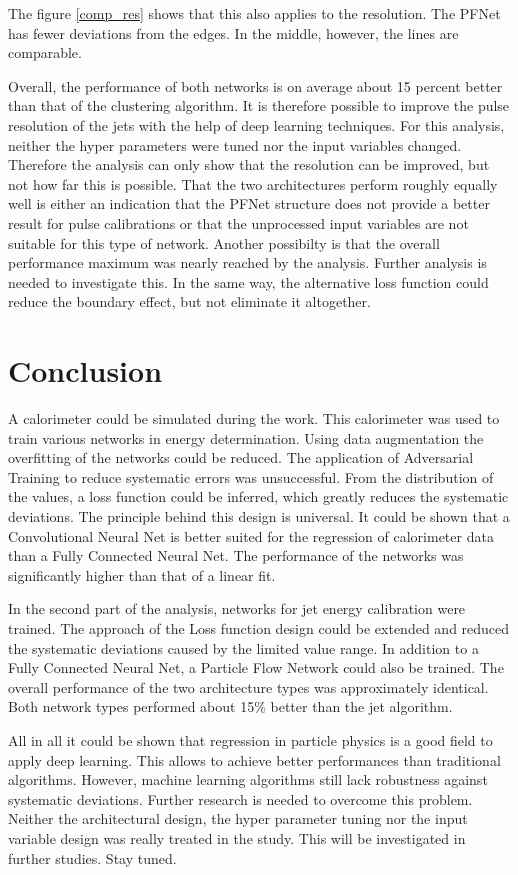 \documentclass[12pt, a4paper]{thesis}
\begin{document}
The figure \ref{comp_res} shows that this also applies to the
resolution. The PFNet has fewer deviations from the edges. In the
middle, however, the lines are comparable.

Overall, the performance of both networks is on average about 15
percent better than that of the clustering algorithm.  It is therefore
possible to improve the pulse resolution of the jets with the help of
deep learning techniques.  For this analysis, neither the hyper
parameters were tuned nor the input variables changed. Therefore the
analysis can only show that the resolution can be improved, but not
how far this is possible. That the two architectures perform roughly
equally well is either an indication that the PFNet structure does not
provide a better result for pulse calibrations or that the unprocessed
input variables are not suitable for this type of network. Another
possibilty is that the overall performance maximum was nearly reached
by the analysis. Further analysis is needed to investigate this.  In
the same way, the alternative loss function could reduce the boundary
effect, but not eliminate it altogether.

\chapter{Conclusion}
\label{sec:org62a45ca}

A calorimeter could be simulated during the work. This calorimeter was
used to train various networks in energy determination. Using data
augmentation the overfitting of the networks could be reduced. The
application of Adversarial Training to reduce systematic errors was
unsuccessful.  From the distribution of the values, a loss function
could be inferred, which greatly reduces the systematic
deviations. The principle behind this design is universal. It could be
shown that a Convolutional Neural Net is better suited for the
regression of calorimeter data than a Fully Connected Neural Net. The
performance of the networks was significantly higher than that of a
linear fit.

In the second part of the analysis, networks for jet energy
calibration were trained.  The approach of the Loss function design
could be extended and reduced the systematic deviations caused by the
limited value range. In addition to a Fully Connected Neural Net, a
Particle Flow Network could also be trained. The overall performance
of the two architecture types was approximately identical. Both
network types performed about 15\% better than the jet algorithm.

All in all it could be shown that regression in particle physics is a
good field to apply deep learning. This allows to achieve better
performances than traditional algorithms. However, machine learning
algorithms still lack robustness against systematic
deviations. Further research is needed to overcome this
problem. Neither the architectural design, the hyper parameter tuning
nor the input variable design was really treated in the study. This
will be investigated in further studies. Stay tuned.


\appendix
\cleardoublepage



\end{document}
